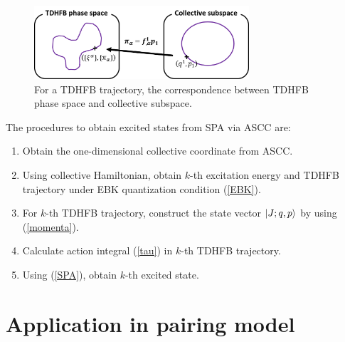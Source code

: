 \documentclass[%
superscriptaddress,
showpacs,
nofootinbib,
amsmath,amssymb,
aps,
prc,
twocolumn,
floatfix ]%
{revtex4-1}
\begin{document}
\begin{figure}[htbp]
 \begin{center}
    \includegraphics[width=80mm, bb=0 0 550 180]{SPA.png}
 \end{center}
  \caption{For a TDHFB trajectory, the correspondence between TDHFB phase space and collective subspace.}
  \label{correspondence}
\end{figure}

The procedures to obtain excited states from SPA via ASCC are:
\begin{enumerate}
\item Obtain the one-dimensional collective coordinate from ASCC.
\item Using collective Hamiltonian, obtain $k$-th excitation energy and TDHFB trajectory under EBK quantization condition (\ref{EBK}).
\item For $k$-th TDHFB trajectory, construct the state vector $\ket{J;q,p}$ by using (\ref{momenta}).
\item Calculate action integral (\ref{tau}) in $k$-th TDHFB trajectory.
\item Using (\ref{SPA}), obtain $k$-th excited state.
\end{enumerate}


\section{Application in pairing model}
\label{sec3}
\end{document}
